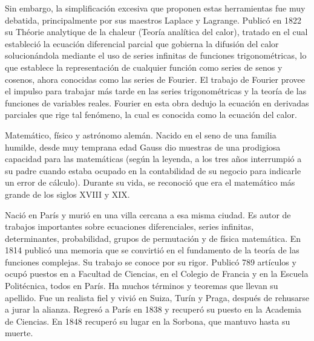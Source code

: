 \begin{parchment}
{Sin embargo, la simplificación excesiva que proponen estas herramientas fue muy debatida, principalmente por sus maestros Laplace y Lagrange.
Publicó en 1822 su Théorie analytique de la chaleur (Teoría analítica del calor), tratado en el cual estableció la ecuación diferencial parcial que gobierna la difusión del calor solucionándola mediante el uso de series infinitas de funciones trigonométricas, lo que establece la representación de cualquier función como series de senos y cosenos, ahora conocidas como las series de Fourier. El trabajo de Fourier provee el impulso para trabajar más tarde en las series trigonométricas y la teoría de las funciones de variables reales.
Fourier en esta obra dedujo la ecuación en derivadas parciales que rige tal fenómeno, la cual es conocida como la ecuación del calor.}
\end{parchment}


\begin{parchment}{ Matemático, físico y astrónomo alemán. Nacido en el seno de una familia humilde, desde muy temprana edad Gauss dio muestras de una prodigiosa capacidad para las matemáticas (según la leyenda, a los tres años interrumpió a su padre cuando estaba ocupado en la contabilidad de su negocio para indicarle un error de cálculo). Durante su vida, se reconoció que era el matemático más grande de los siglos XVIII y XIX. }
\end{parchment}


\begin{parchment}{ Nació en París y murió en una villa cercana a esa misma ciudad. Es autor de trabajos importantes sobre ecuaciones diferenciales, series infinitas, determinantes, probabilidad, grupos de permutación y de física matemática. En 1814 publicó una memoria que se convirtió en el fundamento de la teoría de las funciones complejas. Su trabajo se conoce por su rigor. Publicó 789 artículos y ocupó puestos en a Facultad de Ciencias, en el Colegio de Francia y en la Escuela Politécnica, todos en París. Ha muchos términos y teoremas que llevan su apellido. Fue un realista fiel y vivió en Suiza, Turín y Praga, después de rehusarse a jurar la alianza. Regresó a París en 1838 y recuperó su puesto en la Academia de Ciencias. En 1848 recuperó su lugar en la Sorbona, que mantuvo hasta su muerte.}
\end{parchment}


